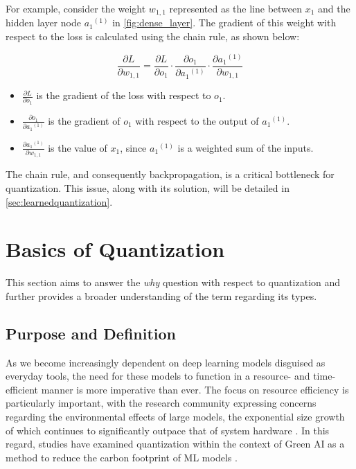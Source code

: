 For example, consider the weight \( w_{1,1} \) represented as the line between \( x_1 \)
 and the hidden layer node \( {a_1}^{(1)} \) in \cref{fig:dense_layer}. 
The gradient of this weight with respect to the loss is calculated using the chain rule,
as shown below:

\[
\frac{\partial L}{\partial w_{1,1}} = \frac{\partial L}{\partial o_1} \cdot \frac{\partial o_1}{\partial {a_1}^{(1)}} \cdot \frac{\partial {a_1}^{(1)}}{\partial w_{1,1}}
\]

\begin{itemize}
    \item \( \frac{\partial L}{\partial o_1} \) is the gradient of the loss with respect to \( o_1 \).
    \item \( \frac{\partial o_1}{\partial {a_1}^{(1)}} \) is the gradient of \( o_1 \) with respect to the output of \( {a_1}^{(1)} \).
    \item \( \frac{\partial {a_1}^{(1)} }{\partial w_{1,1}} \) is the value of  \( x_1 \), since  \( {a_1}^{(1)} \) is a weighted sum of the inputs.
\end{itemize}

The chain rule, and consequently backpropagation, is a critical bottleneck for quantization. 
This issue, along with its solution, will be detailed in \cref{sec:learnedquantization}.


\section{Basics of Quantization}
\label{sec:basicsofquantization}
\hspace*{1em}This section aims to answer the \textit{why} question with respect to quantization and further provides a broader understanding of the term regarding its types.


\subsection{Purpose and Definition}
\label{subsec:purposeanddefinition}
\hspace*{1em}As we become increasingly dependent on deep learning models disguised as everyday tools, 
the need for these models to function in a resource- and time-efficient manner is more imperative than ever. 
The focus on resource efficiency is particularly important, 
with the research community expressing concerns regarding the environmental effects of large models, 
the exponential size growth of which continues to significantly outpace that of system hardware \cite{DBLP:journals/corr/abs-2111-00364}. 
In this regard, studies have examined quantization within the context of Green AI as a method to reduce the carbon footprint of
ML models \cite{DBLP:journals/csi/RegueroMV25}.

